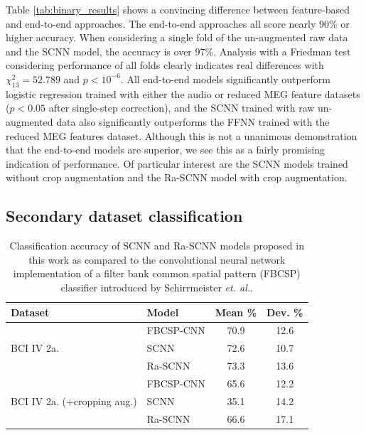 \documentclass[fleqn,10pt]{wlscirep}
\begin{document}
Table \ref{tab:binary_results} shows a convincing difference between feature-based and end-to-end approaches. The end-to-end approaches all score nearly 90\% or higher accuracy. When considering a single fold of the un-augmented raw data and the SCNN model, the accuracy is over 97\%. Analysis with a Friedman test considering performance of all folds clearly indicates real differences with $\chi^2_{13}=52.789$ and $p<10^{-6}$. All end-to-end models significantly outperform logistic regression trained with either the audio or reduced MEG feature datasets ($p<0.05$ after single-step correction), and the SCNN trained with raw un-augmented data also significantly outperforms the FFNN trained with the reduced MEG features dataset. Although this is not a unanimous demonstration that the end-to-end models are superior, we see this as a fairly promising indication of performance. Of particular interest are the SCNN models trained without crop augmentation and the Ra-SCNN model with crop augmentation.


\subsection*{Secondary dataset classification}

\begin{table}[t]
 \caption{Classification accuracy of SCNN and Ra-SCNN models proposed in this work as compared to the convolutional neural network implementation of a filter bank common spatial pattern (FBCSP) classifier introduced by Schirrmeister {\em et. al.}\cite{Schirrmeister2017}.}
 \centering
 \begin{tabular}{l l | c | c}
   \toprule
   \textbf{Dataset} & \textbf{Model} & \textbf{Mean \%} & \textbf{Dev. \%} \\
   \toprule
   \multirow{3}{*}{BCI IV 2a.}
                        & FBCSP-CNN           & 70.9 & 12.6  \\
                        & SCNN                & 72.6 & 10.7  \\
                        & Ra-SCNN             & 73.3 & 13.6  \\ 
   \midrule
   \multirow{3}{*}{BCI IV 2a. (+cropping aug.)}
                        & FBCSP-CNN           & 65.6 & 12.2  \\
                        & SCNN                & 35.1 & 14.2  \\
                        & Ra-SCNN             & 66.6 & 17.1  \\ 
   \bottomrule
 \end{tabular}
 \label{tab:sec_results}
\end{table}
\end{document}
